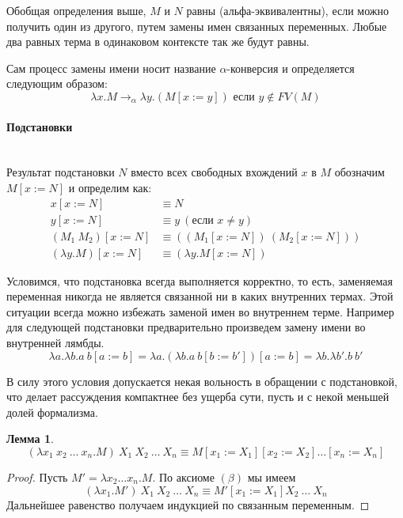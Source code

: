 \documentclass[lambda.tex]{subfiles}
\begin{document}

Обобщая определения выше, $M$ и $N$ равны (альфа-эквивалентны), если можно получить один из другого, путем замены имен связанных переменных. Любые два равных терма в одинаковом контексте так же будут равны.

Сам процесс замены имени носит название $\alpha$-конверсия и определяется следующим образом:
\begin{equation*}
\lambda x.M \rightarrow_\alpha \lambda y.(M[x := y]) \text { если } y \not\in FV(M)\tag{$\alpha$}
\end{equation*}


\paragraph{Подстановки} %
\label{par:substitution}
~\\
Результат подстановки $N$ вместо всех свободных вхождений $x$ в $M$ обозначим $M[x := N]$ и определим как:
\begin{align*}
x[x := N] &\equiv N\\
y[x := N] &\equiv y\ (\text{если } x \neq y)\\
(M_1 \ M_2 )[x := N] &\equiv ((M_1 [x := N])\ (M_2 [x := N]))\\
(\lambda y.M)[x := N] &\equiv (\lambda y.M[x := N])
\end{align*}


Условимся, что подстановка всегда выполняется корректно, то есть, заменяемая переменная никогда не является связанной ни в каких внутренних термах. Этой ситуации всегда можно избежать заменой имен во внутреннем терме. Например для следующей подстановки предварительно произведем замену имени во внутренней лямбды.
\[\lambda a.\lambda b.a\ b[a := b] = \lambda a.(\lambda b.a\ b[b := b'])[a := b] = \lambda b.\lambda b'.b\ b'\]

В силу этого условия допускается некая вольность в обращении с подстановкой, что делает рассуждения компактнее без ущерба сути, пусть и с некой меньшей долей формализма.

\newtheorem{lemma}{Лемма}

\begin{lemma}
\[(\lambda x_1 \ x_2 \ \dots\ x_n .M)\ X_1 \ X_2 \ \dots\ X_n \equiv M[x_1 := X_1 ][x_2 := X_2]\dots[x_n := X_n ]\]
\end{lemma}
\begin{proof}
Пусть $M' = \lambda x_2 \dots x_n .M$. По аксиоме $(\beta)$ мы имеем
\[(\lambda x_1 .M')\ X_1 \ X_2 \ \dots\ X_n \equiv M'[x_1 := X_1 ] X_2 \ \dots\ X_n\]
Дальнейшее равенство получаем индукцией по связанным переменным.
\end{proof}
\end{document}
